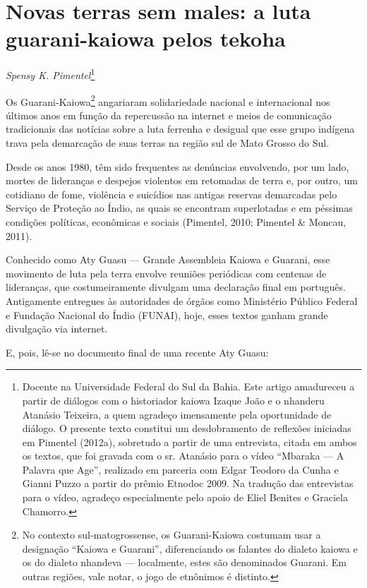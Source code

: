 \chapter{Novas terras sem males: a luta guarani-kaiowa pelos tekoha}
\begin{flushright}
\emph{Spensy K. Pimentel}\footnote{Docente na Universidade Federal do Sul da
Bahia. Este artigo amadureceu a partir de diálogos com o historiador
kaiowa Izaque João e o nhanderu Atanásio Teixeira, a quem agradeço
imensamente pela oportunidade de diálogo. O presente texto constitui um
desdobramento de reflexões iniciadas em Pimentel (2012a), sobretudo a
partir de uma entrevista, citada em ambos os textos, que foi gravada
com o sr. Atanásio para o vídeo ``Mbaraka — A Palavra que Age'',
realizado em parceria com Edgar Teodoro da Cunha e Gianni Puzzo a
partir do prêmio Etnodoc 2009. Na tradução das entrevistas para o
vídeo, agradeço especialmente pelo apoio de Eliel Benites e Graciela
Chamorro.} 
\end{flushright}

Os Guarani-Kaiowa\footnote{No contexto sul-matogrossense, os
Guarani-Kaiowa costumam usar a designação ``Kaiowa e Guarani'',
diferenciando os falantes do dialeto kaiowa e os do dialeto nhandeva —
localmente, estes são denominados Guarani. Em outras regiões, vale
notar, o jogo de etnônimos é distinto.} angariaram solidariedade
nacional e internacional nos últimos anos em função da repercussão na
internet e meios de comunicação tradicionais das notícias sobre a luta
ferrenha e desigual que esse grupo indígena trava pela demarcação de
suas terras na região sul de Mato Grosso do Sul.

Desde os anos 1980, têm sido frequentes as denúncias envolvendo, por um
lado, mortes de lideranças e despejos violentos em retomadas de terra
e, por outro, um cotidiano de fome, violência e suicídios nas antigas
reservas demarcadas pelo Serviço de Proteção ao Índio, as quais se
encontram superlotadas e em péssimas condições políticas, econômicas e
sociais (Pimentel, 2010; Pimentel \& Moncau, 2011).

Conhecido como Aty Guasu — Grande Assembleia Kaiowa e Guarani, esse
movimento de luta pela terra envolve reuniões periódicas com centenas
de lideranças, que costumeiramente divulgam uma declaração final em
português. Antigamente entregues às autoridades de órgãos como
Ministério Público Federal e Fundação Nacional do Índio (FUNAI), hoje,
esses textos ganham grande divulgação via internet.

E, pois, lê-se no documento final de uma recente Aty Guasu:

